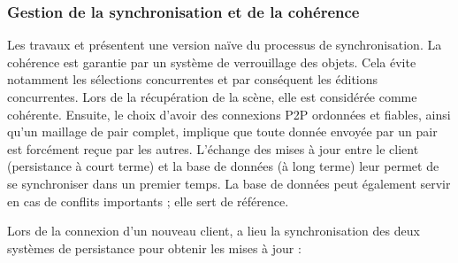 \subsubsection{Gestion de la synchronisation et de la cohérence}
\label{sec:synchronisation-client-serveur}

Les travaux \cite{Desprat2015a} et \cite{Desprat2015b} présentent une version 
naïve du processus de synchronisation. La cohérence est garantie par un système 
de verrouillage des objets. Cela évite notamment les sélections concurrentes et par 
conséquent les éditions concurrentes. 
Lors de la récupération de la scène, elle est considérée comme cohérente. 
Ensuite, le choix d'avoir des connexions \gls{P2P} ordonnées et fiables, ainsi 
qu'un maillage de pair complet, implique que toute donnée envoyée par un pair est 
forcément reçue par les autres. 
L'échange des mises à jour entre le client (persistance à court terme) et la 
base de données (à long terme) leur permet de se synchroniser dans un premier 
temps. La base de données peut également servir en cas de conflits importants ; 
elle sert de référence.

Lors de la connexion d'un nouveau client, a lieu la synchronisation des deux 
systèmes de persistance pour obtenir les mises à jour : 

